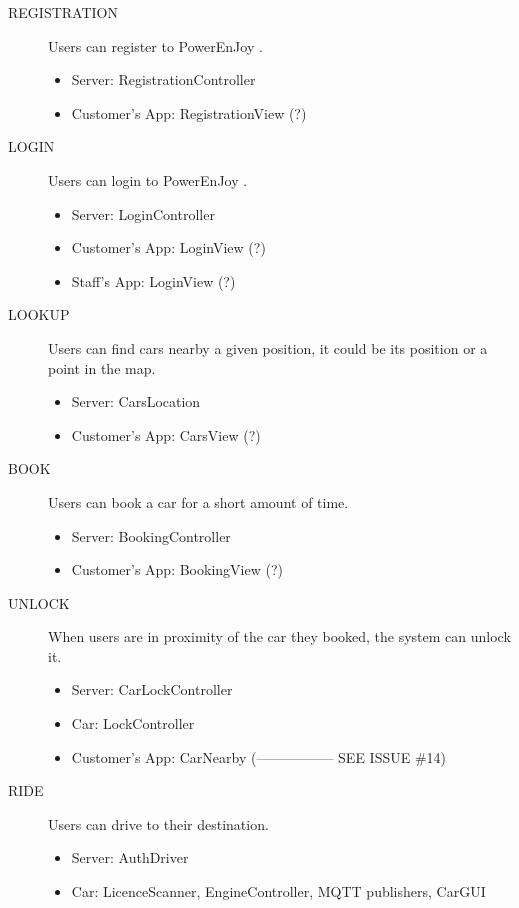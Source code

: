 \documentclass[11pt]{article} %
\newcommand{\pe}{PowerEnJoy }
\begin{document}
 \begin{description}
 	\item[REGISTRATION] Users can register to \pe.
	\begin{itemize}
		\item Server: RegistrationController
		\item Customer's App: RegistrationView (?)
	\end{itemize}

	\item[LOGIN] Users can login to \pe.
	\begin{itemize}
		\item Server: LoginController
		\item Customer's App: LoginView (?)
		\item Staff's App: LoginView (?)
	\end{itemize}

 	\item[LOOKUP] Users can find cars nearby a given position, it could be its position or a point in the map.
	\begin{itemize}
		\item Server: CarsLocation
		\item Customer's App: CarsView (?)
	\end{itemize}

 	\item[BOOK] Users can book a car for a short amount of time.
	\begin{itemize}
		\item Server: BookingController
		\item Customer's App: BookingView (?)
	\end{itemize}

 	\item[UNLOCK] When users are in proximity of the car they booked, the system can unlock it.
	\begin{itemize}
		\item Server: CarLockController
		\item Car: LockController
		\item Customer's App: CarNearby (----------------- SEE ISSUE \#14)
	\end{itemize}

	\item[RIDE] Users can drive to their destination.
	\begin{itemize}
		\item Server: AuthDriver
		\item Car: LicenceScanner, EngineController, MQTT publishers, CarGUI
	\end{itemize}


\end{description}
\end{document}
